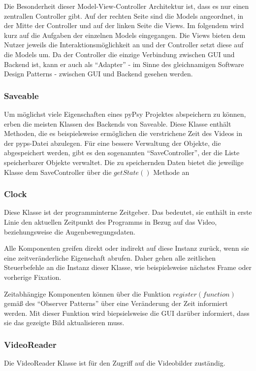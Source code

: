 \documentclass[a4paper,draft]{scrartcl}
\begin{document}
  Die Besonderheit dieser Model-View-Controller Architektur ist, dass es nur einen zentrallen Controller gibt. Auf der rechten Seite sind die Models angeordnet, in der Mitte der Controller und auf der linken Seite die Views. Im folgendem wird kurz auf die Aufgaben der einzelnen Models eingegangen. Die Views bieten dem Nutzer jeweils die Interaktionsmöglichkeit an und der Controller setzt diese auf die Models um. Da der Controller die einzige Verbindung zwischen GUI und Backend ist, kann er auch als "`Adapter"' - im Sinne des gleichnamigen Software Design Patterns - zwischen GUI und Backend gesehen werden. 

\subsubsection{Saveable}
Um möglichst viele Eigenschaften eines pyPsy Projektes abspeichern zu können, erben die meisten Klassen des Backends von Saveable. Diese Klasse enthält Methoden, die es beispielsweise ermöglichen die verstrichene Zeit des Videos in der pyps-Datei abzulegen. 
Für eine bessere Verwaltung der Objekte, die abgespeichert werden, gibt es den sogenannten "`SaveController"', der die Liste speicherbarer Objekte verwaltet. 
Die zu speichernden Daten bietet die jeweilige Klasse dem SaveController über die $getState()$ Methode an

\subsubsection{Clock}
Diese Klasse ist der programminterne Zeitgeber. 
Das bedeutet, sie enthält in erste Linie den aktuellen Zeitpunkt des Programms in Bezug auf das Video, beziehungsweise die Augenbewegungsdaten.

Alle Komponenten greifen direkt oder indirekt auf diese Instanz zurück, wenn sie eine zeitveränderliche Eigenschaft abrufen. Daher gehen alle zeitlichen Steuerbefehle an die Instanz dieser Klasse, wie beispielsweise nächstes Frame oder vorherige Fixation. 

Zeitabhängige Komponenten können über die Funktion $register(function)$ gemäß des "`Observer Patterns"' über eine Veränderung der Zeit informiert werden.
Mit dieser Funktion wird biepsielsweise die GUI darüber informiert, dass sie das gezeigte Bild aktualisieren muss.

\subsubsection{VideoReader}
Die VideoReader Klasse ist für den Zugriff auf die Videobilder zuständig.
\end{document}
